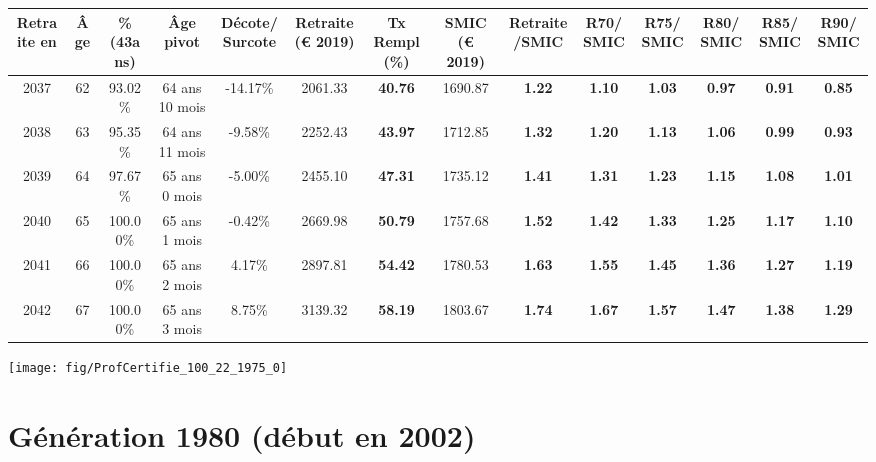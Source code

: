 \begin{adjustbox}{max width=\textwidth} 
\begin{tabular}[htb]{|c|c||c|c|c||c|c||c|c||c|c|c|c|c|} 
\hline 
 Retraite en &  Âge &  \%(43ans) &  Âge pivot &  Décote/Surcote &  Retraite (\euro{} 2019) &  Tx Rempl(\%) &  SMIC (\euro{} 2019) &  Retraite/SMIC &  R70/SMIC &  R75/SMIC &  R80/SMIC &  R85/SMIC &  R90/SMIC \\ 
\hline \hline 
 2037 &  62 &  93.02\% &  64 ans 10 mois &  -14.17\% &  2061.33 &  {\bf 40.76} &  1690.87 &  {\bf 1.22} &  {\bf 1.10} &  {\bf 1.03} &  {\bf {\color{red} 0.97}} &  {\bf {\color{red} 0.91}} &  {\bf {\color{red} 0.85}} \\ 
\hline 
 2038 &  63 &  95.35\% &  64 ans 11 mois &  -9.58\% &  2252.43 &  {\bf 43.97} &  1712.85 &  {\bf 1.32} &  {\bf 1.20} &  {\bf 1.13} &  {\bf 1.06} &  {\bf {\color{red} 0.99}} &  {\bf {\color{red} 0.93}} \\ 
\hline 
 2039 &  64 &  97.67\% &  65 ans 0 mois &  -5.00\% &  2455.10 &  {\bf 47.31} &  1735.12 &  {\bf 1.41} &  {\bf 1.31} &  {\bf 1.23} &  {\bf 1.15} &  {\bf 1.08} &  {\bf 1.01} \\ 
\hline 
 2040 &  65 &  100.00\% &  65 ans 1 mois &  -0.42\% &  2669.98 &  {\bf 50.79} &  1757.68 &  {\bf 1.52} &  {\bf 1.42} &  {\bf 1.33} &  {\bf 1.25} &  {\bf 1.17} &  {\bf 1.10} \\ 
\hline 
 2041 &  66 &  100.00\% &  65 ans 2 mois &  4.17\% &  2897.81 &  {\bf 54.42} &  1780.53 &  {\bf 1.63} &  {\bf 1.55} &  {\bf 1.45} &  {\bf 1.36} &  {\bf 1.27} &  {\bf 1.19} \\ 
\hline 
 2042 &  67 &  100.00\% &  65 ans 3 mois &  8.75\% &  3139.32 &  {\bf 58.19} &  1803.67 &  {\bf 1.74} &  {\bf 1.67} &  {\bf 1.57} &  {\bf 1.47} &  {\bf 1.38} &  {\bf 1.29} \\ 
\hline 
\hline 
\end{tabular} 
\end{adjustbox} 
 
 \vspace{0.1cm} 

 {\hspace{-2.2cm}\texttt{[image: fig/ProfCertifie\_100\_22\_1975\_0]}} 

\newpage 
 
\section{Génération 1980 (début en 2002)\label{ProfCertifie_100_22_1980_0}} 
 
